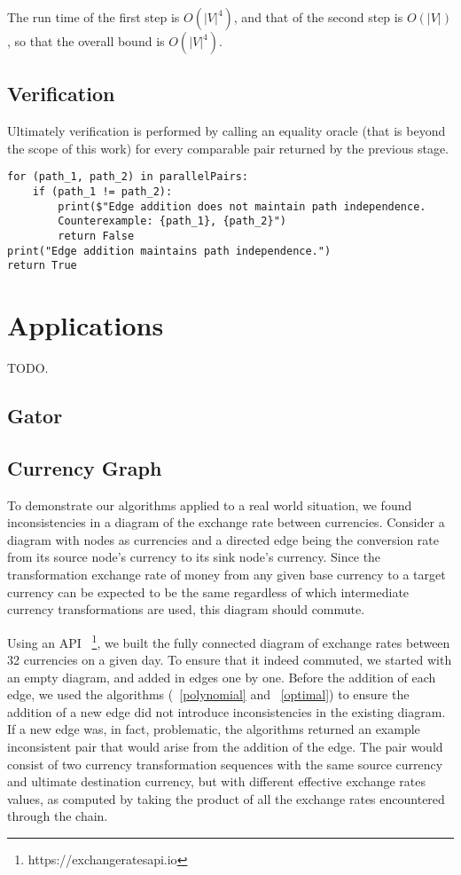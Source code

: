 \documentclass[sigplan,review,anonymous]{acmart}
\begin{document}
The run time of the first step is $O(|V|^4)$, and that of the second step is $O(|V|)$, so that the overall bound is $O(|V|^4)$.

\subsection{Verification}
Ultimately verification is performed by calling an equality oracle (that is beyond the scope of this work) for every comparable pair returned by the previous stage.

\begin{verbatim}
for (path_1, path_2) in parallelPairs:
    if (path_1 != path_2):
        print($"Edge addition does not maintain path independence. 
        Counterexample: {path_1}, {path_2}")
        return False
print("Edge addition maintains path independence.")
return True
\end{verbatim}

\section{Applications}
TODO.
\subsection{Gator}
\subsection{Currency Graph}

To demonstrate our algorithms applied to a real world situation, 
we found inconsistencies in a diagram of the exchange rate between currencies.
Consider a diagram with nodes as currencies and a directed edge being the
conversion rate from its source node's currency to its sink node's currency.
Since the transformation exchange rate of money from any given base currency to a target currency
can be expected to be the same regardless of which intermediate currency transformations
are used, this diagram should commute.

Using an API ~\footnote{https://exchangeratesapi.io}, we built the fully connected diagram of exchange rates between 32 currencies on a given day.
To ensure that it indeed commuted, we started with an empty diagram, and added in edges one by one.
Before the addition of each edge, we used the algorithms (~\ref{polynomial} and ~\ref{optimal}) to ensure the addition of a new edge did not introduce inconsistencies in the existing diagram.
If a new edge was, in fact, problematic, the algorithms returned an example inconsistent
pair that would arise from the addition of the edge.
The pair would consist of two currency transformation sequences with the 
same source currency and ultimate destination currency, but with different effective 
exchange rates values, as computed by taking the product of all the exchange rates
encountered through the chain.
\end{document}
